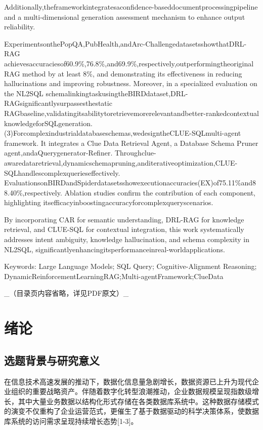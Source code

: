 \documentclass[12pt,a4paper,openright,UTF8]{ctexbook}
\begin{document}
Additionally,theframeworkintegratesaconfidence-baseddocumentprocessingpipeline and a multi-dimensional generation assessment mechanism to enhance output reliability.


ExperimentsonthePopQA,PubHealth,andArc-ChallengedatasetsshowthatDRL-RAG achievesaccuraciesof60.9\%,76.8\%,and69.9\%,respectively,outperformingtheoriginal RAG method by at least 8\%, and demonstrating its effectiveness in reducing hallucinations and improving robustness. Moreover, in a specialized evaluation on the NL2SQL schemalinkingtaskusingtheBIRDdataset,DRL-RAGsignificantlysurpassesthestatic RAGbaseline,validatingitsabilitytoretrievemorerelevantandbetter-rankedcontextual knowledgeforSQLgeneration.(3)Forcomplexindustrialdatabaseschemas,wedesigntheCLUE-SQLmulti-agent framework. It integrates a Clue Data Retrieval Agent, a Database Schema Pruner agent,andaQuerygenerator-Refiner. Throughclue-awaredataretrieval,dynamicschemapruning,anditerativeoptimization,CLUE-SQLhandlescomplexquerieseffectively. EvaluationsonBIRDandSpiderdatasetsshowexecutionaccuracies(EX)of75.11\%and88.40\%,respectively. Ablation studies confirm the contribution of each component, highlighting itsefficacyinboostingaccuracyforcomplexqueryscenarios.


By incorporating CAR for semantic understanding, DRL-RAG for knowledge retrieval, and CLUE-SQL for contextual integration, this work systematically addresses intent ambiguity, knowledge hallucination, and schema complexity in NL2SQL, significantlyenhancingitsperformanceinreal-worldapplications.


Keywords: Large Language Models; SQL Query; Cognitive-Alignment Reasoning; DynamicReinforcementLearningRAG;Multi-agentFramework;ClueData

\tableofcontents

\_（目录页内容省略，详见PDF原文）\_

\chapter{绪论}


\section{选题背景与研究意义}

在信息技术高速发展的推动下，数据化信息量急剧增长，数据资源已上升为现代企业组织的重要战略资产。伴随着数字化转型浪潮推动，企业数据规模呈现指数级增长，其中大量业务数据以结构化形式存储在各类数据库系统中。这种数据存储模式的演变不仅重构了企业运营范式，更催生了基于数据驱动的科学决策体系，使数据库系统的访问需求呈现持续增长态势[1-3]。
\end{document}
